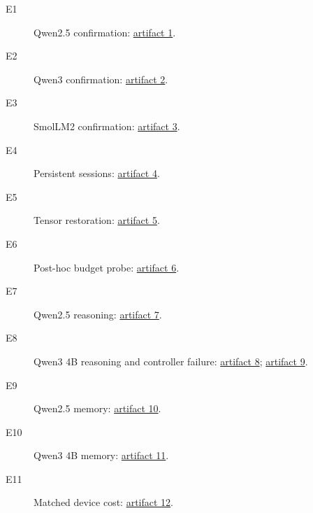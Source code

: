 \begin{description}
\item[E1] Qwen2.5 confirmation: \href{https://github.com/Aperturesurvivor/tiered-kv-cache-research/tree/v1.0.0/results/evidence/demand-Qwen--Qwen2.5-1.5B-Instruct-confirm-d8a93a273235}{artifact 1}.
\item[E2] Qwen3 confirmation: \href{https://github.com/Aperturesurvivor/tiered-kv-cache-research/tree/v1.0.0/results/evidence/demand-Qwen--Qwen3-0.6B-confirm-479bee540057}{artifact 2}.
\item[E3] SmolLM2 confirmation: \href{https://github.com/Aperturesurvivor/tiered-kv-cache-research/tree/v1.0.0/results/evidence/demand-HuggingFaceTB--SmolLM2-1.7B-Instruct-confirm-5ca5b1be952c}{artifact 3}.
\item[E4] Persistent sessions: \href{https://github.com/Aperturesurvivor/tiered-kv-cache-research/tree/v1.0.0/results/evidence/persistent-6c2f54e55ed7}{artifact 4}.
\item[E5] Tensor restoration: \href{https://github.com/Aperturesurvivor/tiered-kv-cache-research/tree/v1.0.0/results/evidence/persistent-probe-0676d46bfe94}{artifact 5}.
\item[E6] Post-hoc budget probe: \href{https://github.com/Aperturesurvivor/tiered-kv-cache-research/tree/v1.0.0/results/evidence/budget-probe-c6e21be15fc9}{artifact 6}.
\item[E7] Qwen2.5 reasoning: \href{https://github.com/Aperturesurvivor/tiered-kv-cache-research/tree/v1.0.0/results/evidence/reasoning-Qwen--Qwen2.5-1.5B-Instruct-8862fb5f28f2}{artifact 7}.
\item[E8] Qwen3 4B reasoning and controller failure: \href{https://github.com/Aperturesurvivor/tiered-kv-cache-research/tree/v1.0.0/results/evidence/reasoning-Qwen--Qwen3-4B-Instruct-2507-67a2e095096b}{artifact 8}; \href{https://github.com/Aperturesurvivor/tiered-kv-cache-research/tree/v1.0.0/results/evidence/qwen4-reasoning-finalization-failure}{artifact 9}.
\item[E9] Qwen2.5 memory: \href{https://github.com/Aperturesurvivor/tiered-kv-cache-research/tree/v1.0.0/results/evidence/memory-Qwen--Qwen2.5-1.5B-Instruct-566c642d5409}{artifact 10}.
\item[E10] Qwen3 4B memory: \href{https://github.com/Aperturesurvivor/tiered-kv-cache-research/tree/v1.0.0/results/evidence/memory-Qwen--Qwen3-4B-Instruct-2507-991d4e87104b}{artifact 11}.
\item[E11] Matched device cost: \href{https://github.com/Aperturesurvivor/tiered-kv-cache-research/tree/v1.0.0/results/evidence/attention-device-cost-af741c7-attempt2}{artifact 12}.

\end{description}
